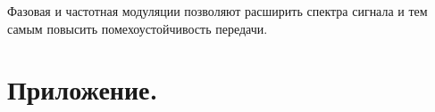 \documentclass[a4paper,14pt]{extarticle}
\begin{document}
Фазовая и частотная модуляции позволяют расширить спектра сигнала и тем самым повысить помехоустойчивость передачи.


\section{Приложение.}




\end{document}
